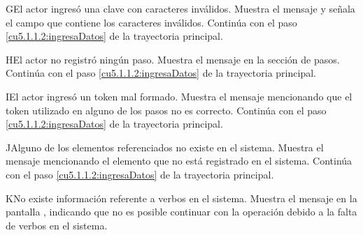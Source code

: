  \begin{UCtrayectoriaA}{G}{El actor ingresó una clave con caracteres inválidos.}
    \UCpaso[\UCsist] Muestra el mensaje  y señala el campo que contiene los caracteres inválidos.
    \UCpaso[] Continúa con el paso \ref{cu5.1.1.2:ingresaDatos} de la trayectoria principal.
 \end{UCtrayectoriaA}
 \begin{UCtrayectoriaA}{H}{El actor no registró ningún paso.}
    \UCpaso[\UCsist] Muestra el mensaje  en la sección de pasos.
    \UCpaso[] Continúa con el paso \ref{cu5.1.1.2:ingresaDatos} de la trayectoria principal.
 \end{UCtrayectoriaA}
 \begin{UCtrayectoriaA}{I}{El actor ingresó un token mal formado.}
    \UCpaso[\UCsist] Muestra el mensaje  mencionando que el token utilizado en alguno de los pasos no es correcto.
    \UCpaso[] Continúa con el paso \ref{cu5.1.1.2:ingresaDatos} de la trayectoria principal.
 \end{UCtrayectoriaA}
 \begin{UCtrayectoriaA}{J}{Alguno de los elementos referenciados no existe en el sistema.}
    \UCpaso[\UCsist] Muestra el mensaje  mencionando el elemento que no está registrado en el sistema.
    \UCpaso[] Continúa con el paso \ref{cu5.1.1.2:ingresaDatos} de la trayectoria principal.
 \end{UCtrayectoriaA}
 \begin{UCtrayectoriaA}{K}{No existe información referente a verbos en el sistema.}
    \UCpaso[\UCsist] Muestra el mensaje  en la pantalla , indicando que no es posible
	continuar con la operación debido a la falta de verbos en el sistema.
 \end{UCtrayectoriaA}
